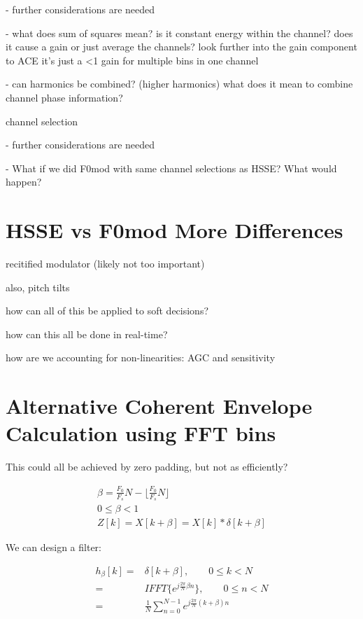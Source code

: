 \documentclass [11pt, proquest] {uwthesis}[2015/03/03]
\begin{document}
 - further considerations are needed

 - what does sum of squares mean? is it constant energy within the channel?  does it cause a gain or just average the channels?  look further into the gain component to ACE
    it's just a <1 gain for multiple bins in one channel

 - can harmonics be combined? (higher harmonics) what does it mean to combine channel phase information?

channel selection

 - further considerations are needed

 - What if we did F0mod with same channel selections as HSSE?  What would happen?

\section{HSSE vs F0mod More Differences}

recitified modulator (likely not too important)

also, pitch tilts

how can all of this be applied to soft decisions?

how can this all be done in real-time?

how are we accounting for non-linearities: AGC and sensitivity




\section{Alternative Coherent Envelope Calculation using FFT bins}

This could all be achieved by zero padding, but not as efficiently?

\begin{align}
\beta = \frac{F_0}{F_s}N - \Big\lfloor \frac{F_0}{F_s}N \Big\rfloor \\
0 \leq \beta < 1 \nonumber \\
Z[k] = X[k + \beta] = X[k] * \delta[k + \beta] \nonumber
\end{align}

We can design a filter:

\begin{align}
h_{\beta}[k] =& \delta[k + \beta], \qquad 0 \leq k < N  \nonumber \\
=& IFFT\{e^{j\frac{2\pi}{N} \beta n} \}, \qquad 0 \leq n < N \nonumber \\
=& \frac{1}{N} \sum_{n=0}^{N-1} e^{j\frac{2\pi}{N}(k + \beta)n}
\end{align}
\end{document}
